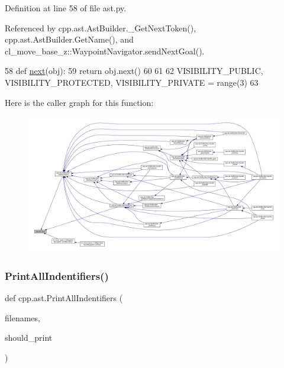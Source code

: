 Definition at line 58 of file ast.\+py.



Referenced by cpp.\+ast.\+Ast\+Builder.\+\_\+\+Get\+Next\+Token(), cpp.\+ast.\+Ast\+Builder.\+Get\+Name(), and cl\+\_\+move\+\_\+base\+\_\+z\+::\+Waypoint\+Navigator.\+send\+Next\+Goal().


\begin{DoxyCode}
58     \textcolor{keyword}{def }\hyperlink{namespacecpp_1_1ast_a39ad8261fef5e0a7c1c17c510541b66f}{next}(obj):
59         \textcolor{keywordflow}{return} obj.next()
60 
61 
62 VISIBILITY\_PUBLIC, VISIBILITY\_PROTECTED, VISIBILITY\_PRIVATE = range(3)
63 
\end{DoxyCode}
Here is the caller graph for this function\+:
\nopagebreak
\begin{figure}[H]
\begin{center}
\leavevmode
\includegraphics[width=350pt]{namespacecpp_1_1ast_a39ad8261fef5e0a7c1c17c510541b66f_icgraph}
\end{center}
\end{figure}
\mbox{\label{namespacecpp_1_1ast_abc501124095357c1cf56eaf10e1df327}} 
\subsubsection{\texorpdfstring{Print\+All\+Indentifiers()}{PrintAllIndentifiers()}}
{\footnotesize\ttfamily def cpp.\+ast.\+Print\+All\+Indentifiers (\begin{DoxyParamCaption}\item[{}]{filenames,  }\item[{}]{should\+\_\+print }\end{DoxyParamCaption})}

